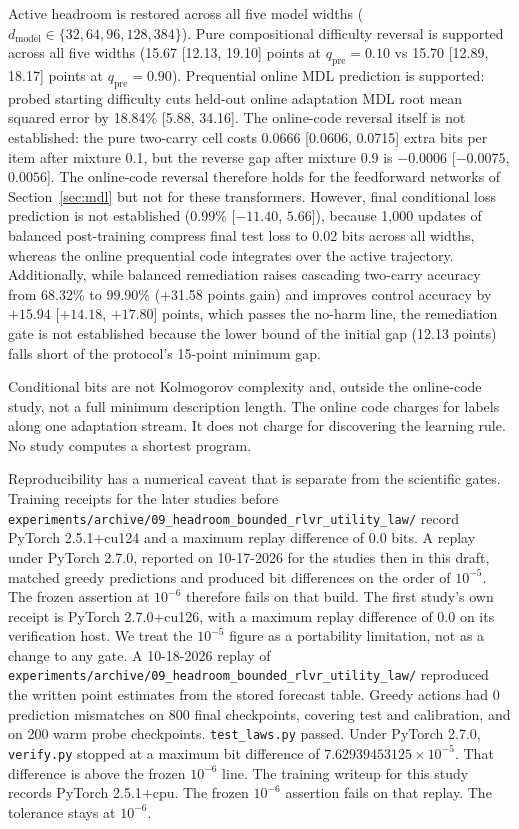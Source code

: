 Active headroom is restored across all five model widths ($d_{\text{model}} \in \{32, 64, 96, 128, 384\}$).
Pure compositional difficulty reversal is supported across all five widths (15.67 [12.13, 19.10] points at $q_{\text{pre}}=0.10$ vs 15.70 [12.89, 18.17] points at $q_{\text{pre}}=0.90$).
Prequential online MDL prediction is supported: probed starting difficulty cuts held-out online adaptation MDL root mean squared error by 18.84\% [5.88, 34.16].
The online-code reversal itself is not established: the pure two-carry cell costs 0.0666 [0.0606, 0.0715] extra bits per item after mixture 0.1, but the reverse gap after mixture 0.9 is $-0.0006$ [$-0.0075$, $0.0056$].
The online-code reversal therefore holds for the feedforward networks of Section~\ref{sec:mdl} but not for these transformers.
However, final conditional loss prediction is not established (0.99\% [$-11.40$, $5.66$]), because 1{,}000 updates of balanced post-training compress final test loss to 0.02 bits across all widths, whereas the online prequential code integrates over the active trajectory.
Additionally, while balanced remediation raises cascading two-carry accuracy from 68.32\% to 99.90\% (+31.58 points gain) and improves control accuracy by $+15.94$ [$+14.18$, $+17.80$] points, which passes the no-harm line, the remediation gate is not established because the lower bound of the initial gap (12.13 points) falls short of the protocol's 15-point minimum gap.

Conditional bits are not Kolmogorov complexity and, outside the online-code study, not a full minimum description length.
The online code charges for labels along one adaptation stream.
It does not charge for discovering the learning rule.
No study computes a shortest program.

Reproducibility has a numerical caveat that is separate from the scientific gates.
Training receipts for the later studies before \texttt{experiments/archive/09\_headroom\_bounded\_rlvr\_utility\_law/} record PyTorch 2.5.1+cu124 and a maximum replay difference of 0.0 bits.
A replay under PyTorch 2.7.0, reported on 10-17-2026 for the studies then in this draft, matched greedy predictions and produced bit differences on the order of $10^{-5}$.
The frozen assertion at $10^{-6}$ therefore fails on that build.
The first study's own receipt is PyTorch 2.7.0+cu126, with a maximum replay difference of 0.0 on its verification host.
We treat the $10^{-5}$ figure as a portability limitation, not as a change to any gate.
A 10-18-2026 replay of \texttt{experiments/archive/09\_headroom\_bounded\_rlvr\_utility\_law/} reproduced the written point estimates from the stored forecast table.
Greedy actions had 0 prediction mismatches on 800 final checkpoints, covering test and calibration, and on 200 warm probe checkpoints.
\texttt{test\_laws.py} passed.
Under PyTorch 2.7.0, \texttt{verify.py} stopped at a maximum bit difference of $7.62939453125\times 10^{-5}$.
That difference is above the frozen $10^{-6}$ line.
The training writeup for this study records PyTorch 2.5.1+cpu.
The frozen $10^{-6}$ assertion fails on that replay.
The tolerance stays at $10^{-6}$.

